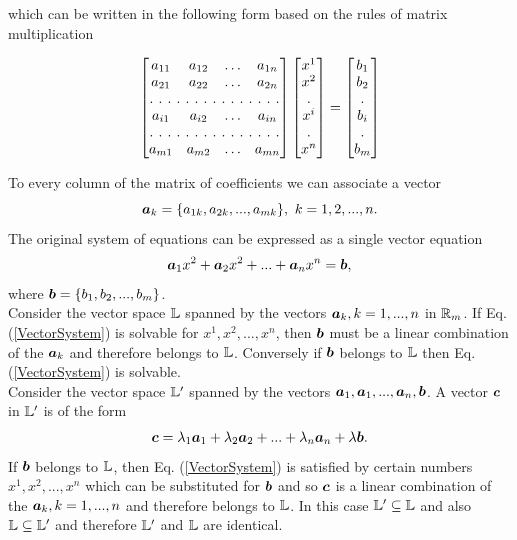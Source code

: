 which can be written in the following form based on the rules of matrix multiplication

\begin{equation}
\begin{bmatrix}
a_{11} & a_{12}  & \hdots & a_{1n}  \\
a_{21} & a_{22}  & \hdots & a_{2n}  \\
\hdotsfor[2]{4}\\
a_{i1} & a_{i2}  & \hdots & a_{in}  \\
\hdotsfor[2]{4}\\
a_{m1} & a_{m2}  & \hdots & a_{mn}  \\
\end{bmatrix}
\begin{bmatrix}
x^1\\
x^2\\
.\\
x^i\\
.\\
x^n\\
\end{bmatrix}
=
\begin{bmatrix}
b_1\\
b_2\\
.\\
b_i\\
.\\
b_m\\
\end{bmatrix}
\label{MatrixSystem}
\end{equation}

To every column of the matrix of coefficients we can associate a vector
$$\boldsymbol{a}_k = \{a_{1k}, a_{2k},...,a_{mk}\}, ~k = 1,2,...,n.$$
The original system of equations can be expressed as a single vector equation
\begin{equation}\boldsymbol{a}_1 x^2 + \boldsymbol{a}_2 x^2 + ... + \boldsymbol{a}_n x^n = \boldsymbol{b},\label{VectorSystem}\end{equation} where $\boldsymbol{b} = \{b_1, b_2, ..., b_m\}$. \\

Consider the vector space $\mathbb{L}$ spanned by the vectors $\boldsymbol{a}_k, k = 1,...,n$ in $\mathbb{R}_m$. If Eq.(\ref{VectorSystem}) is solvable for $x^1, x^2, ..., x^n$, then $\boldsymbol{b}$ must be a linear combination of the $\boldsymbol{a}_k$ and therefore belongs to $\mathbb{L}$. Conversely if $\boldsymbol{b}$ belongs to $\mathbb{L}$ then Eq.(\ref{VectorSystem}) is solvable. \\

Consider the vector space $\mathbb{L}'$ spanned by the vectors $\boldsymbol{a}_1, \boldsymbol{a}_1, ..., \boldsymbol{a}_n, \boldsymbol{b}$. A vector $\boldsymbol{c}$ in $\mathbb{L}'$ is of the form 
$$\boldsymbol{c} = \lambda_1 \boldsymbol{a}_1 + \lambda_2 \boldsymbol{a}_2 + ... + \lambda_n \boldsymbol{a}_n + \lambda \boldsymbol{b}.$$ If $\boldsymbol{b}$ belongs to $\mathbb{L}$, then Eq. (\ref{VectorSystem}) is satisfied by certain numbers $x^1, x^2, ..., x^n$ which can be substituted for 
$\boldsymbol{b}$ and so $\boldsymbol{c}$ is a linear combination of the $\boldsymbol{a}_k, k = 1,..., n$ and therefore belongs to $\mathbb{L}$. In this case $\mathbb{L}' \subseteq \mathbb{L}$ and also $\mathbb{L} \subseteq \mathbb{L}'$ and therefore $\mathbb{L}'$ and $\mathbb{L}$ are identical. 

